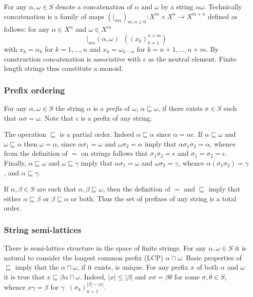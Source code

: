 \documentclass[a4paper]{article}
\newcommand{\brac}[1]{{\left ( #1 \right )}}
\newcommand{\abs}[1]{{\left | #1 \right |}}
\newcommand{\defn}{\mathop{\overset{\Delta}{=}}\nolimits}
\begin{document}
For any $\alpha,\omega\in S$ denote a concatenation of $\alpha$ and $\omega$ by a string $\alpha\omega$. Technically concatenation is a family of maps $\brac{\vert_{mn}}_{m,n\geq 0}:X^m\times X^n\to X^{m+n}$ defined as follows: for any $\alpha\in X^n$ and $\omega\in X^m$ \[\vert_{mn}(\alpha,\omega) \defn \brac{ \brac{x_k}_{k=1}^{n+m} }\] with $x_k=\alpha_k$ for $k=1,\ldots,n$ and $x_k = \omega_{k-n}$ for $k={n+1},\ldots,{n+m}$. By construction concatenation is associative with $\epsilon$ as the neutral element. Finite length strings thus constitute a monoid.

\subsubsection{Prefix ordering} %
\label{ssub:prefix_ordering}

For any $\alpha,\omega \in S$ the string $\alpha$ is a \emph{prefix} of $\omega$, $\alpha\sqsubseteq\omega$, if there exists $\sigma\in S$ such that $\alpha\sigma=\omega$. Note that $\epsilon$ is a prefix of any string.

The operation $\sqsubseteq$ is a partial order. Indeed $\alpha\sqsubseteq\alpha$ since $\alpha = \alpha\epsilon$. If $\alpha\sqsubseteq \omega$ and $\omega \sqsubseteq \alpha$ then $\omega=\alpha$, since $\alpha\sigma_1=\omega$ and $\omega\sigma_2=\alpha$ imply that $\alpha\sigma_1\sigma_2 = \alpha$, whence from the definition of $=$ on strings follows that $\sigma_1\sigma_2=\epsilon$ and $\sigma_1=\sigma_2=\epsilon$. Finally, $\alpha\sqsubseteq\omega$ and $\omega\sqsubseteq\gamma$ imply that $\alpha\sigma_1=\omega$ and $\omega\sigma_2=\gamma$, whence $\alpha(\sigma_1\sigma_2)=\gamma$, and $\alpha\sqsubseteq\gamma$.

If $\alpha, \beta\in S$ are such that $\alpha,\beta\sqsubseteq \omega$, then the definition of $=$ and $\sqsubseteq$ imply that either $\alpha\sqsubseteq\beta$ or $\beta\sqsubseteq\alpha$ or both. Thus the set of prefixes of any string is a total order.


\subsubsection{String semi-lattices} %
\label{ssub:string_semi_lattice}

There is semi-lattice structure in the space of finite strings. For any $\alpha,\omega\in S$ it is natural to consider the longest common prefix (LCP) $\alpha\sqcap \omega$. Basic properties of $\sqsubseteq$ imply that the $\alpha\sqcap \omega$, if it exists, is unique. For any prefix $x$ of both $\alpha$ and $\omega$ it is true that $x\sqsubseteq \beta \alpha\sqcap\omega$. Indeed, $\abs{x}\leq \abs{\beta}$ and $x\sigma = \beta\theta$ for some $\sigma,\theta\in S$, whence $x\gamma = \beta$ for $\gamma \defn \brac{\sigma_k}_{k=1}^{\abs{\beta}-\abs{x}}$.
\end{document}
